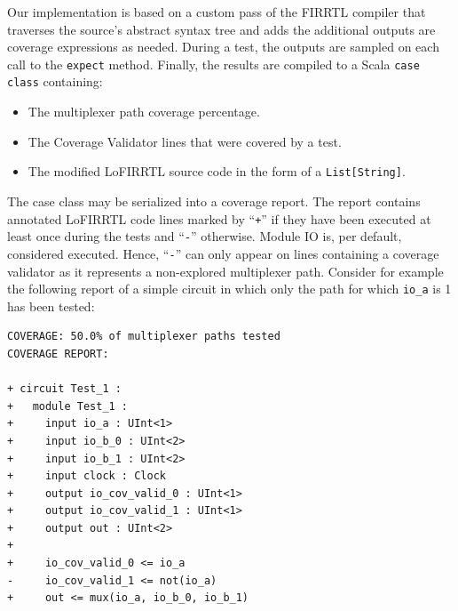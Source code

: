 \documentclass[conference]{IEEEtran}
\begin{document}
Our implementation is based on a custom pass of the FIRRTL compiler that traverses the source's abstract syntax tree and adds the additional outputs are coverage expressions as needed. During a test, the outputs are sampled on each call to the \texttt{expect} method. Finally, the results are compiled to a Scala \texttt{case class} containing:%
\begin{itemize}
\item The multiplexer path coverage percentage.
\item The Coverage Validator lines that were covered by a test.
\item The modified LoFIRRTL source code in the form of a \texttt{List[String]}.
\end{itemize}
The case class may be serialized into a coverage report. The report contains annotated LoFIRRTL code lines marked by ``\texttt{+}'' if they have been executed at least once during the tests and ``\texttt{-}'' otherwise. Module IO is, per default, considered executed. Hence, ``\texttt{-}'' can only appear on lines containing a coverage validator as it represents a non-explored multiplexer path. Consider for example the following report of a simple circuit in which only the path for which \texttt{io\_a} is 1 has been tested:
\begin{verbatim}
COVERAGE: 50.0% of multiplexer paths tested
COVERAGE REPORT:

+ circuit Test_1 :
+   module Test_1 :
+     input io_a : UInt<1>
+     input io_b_0 : UInt<2>
+     input io_b_1 : UInt<2>
+     input clock : Clock
+     output io_cov_valid_0 : UInt<1>
+     output io_cov_valid_1 : UInt<1>
+     output out : UInt<2>
+   
+     io_cov_valid_0 <= io_a
-     io_cov_valid_1 <= not(io_a)
+     out <= mux(io_a, io_b_0, io_b_1)
\end{verbatim}
\end{document}
